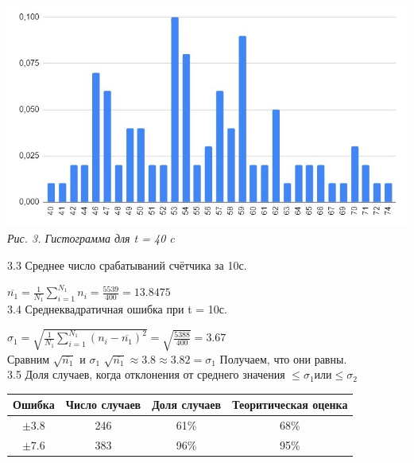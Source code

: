 \documentclass[12pt, a4paper]{article}
\begin{document}
            \begin{minipage}[c]{\textwidth}
                \begin{center}
                    \includegraphics[scale=0.7]{Pics/hist2.jpg} \\
                    \textit{\textcolor[HTML]{000000}{Рис. 3. Гистограмма для t = 40 c}}
                \end{center}
            \end{minipage}

            \vspace*{0.6cm}
            \newpage
          {\large 3.3 Среднее число срабатываний счётчика за 10с. \\}

          $\overline{n_1} = \frac{1}{N_1} \sum_{i = 1}^{N_1} n_i = \frac{5539}{400} = 13.8475 $ \\

          {\large 3.4 Среднеквадратичная ошибка при t = 10с. \\}

            $\sigma_1 = \sqrt{\frac{1}{N_1} \sum_{i = 1}^{N_1} (n_i - \overline{n_1})^2} = \sqrt{\frac{5388}{400}} = 3.67$ \\
            Сравним $\sqrt{\overline{n_1}}$ и $\sigma_1$
            $\sqrt{\overline{n_1}} \approx 3.8 \approx 3.82 = \sigma_1$
            Получаем, что они равны. \\

          {\large 3.5 Доля случаев, когда отклонения от среднего значения $\leq \sigma_1 или \leq \sigma_2$ \\}

          \begin{center}
            \begin{tabular}{ |c|c|c|c| } \hline
            Ошибка & Число случаев & Доля случаев & Теоритическая оценка \\ \hline 
            $\pm 3.8$ & 246 & 61\% & 68\% \\ \hline 
            $\pm 7.6$ & 383 & 96\% & 95\% \\ \hline
            \end{tabular}
            \end{center} 
  
\end{document}
